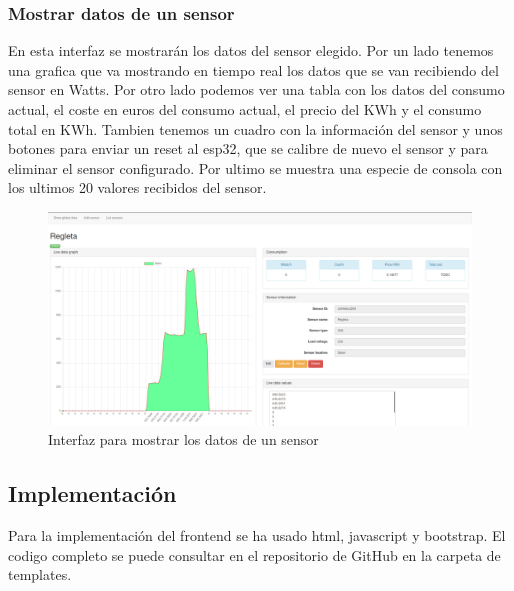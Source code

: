 \begin{titlepage}
\subsubsection{Mostrar datos de un sensor}
En esta interfaz se mostrarán los datos del sensor elegido. Por un lado tenemos una grafica que va mostrando en tiempo real los datos que se van recibiendo del sensor en Watts. Por otro lado podemos ver una tabla con los datos del consumo actual, el coste en euros del consumo actual, el precio del KWh y el consumo total en KWh. Tambien tenemos un cuadro con la información del sensor y unos botones para enviar un reset al esp32, que se calibre de nuevo el sensor y para eliminar el sensor configurado. Por ultimo se muestra una especie de consola con los ultimos 20 valores recibidos del sensor. 
\begin{figure}[h!]
	\centering
	\includegraphics[width=1\textwidth]{imagenes/web_datos.png}
	\caption{Interfaz para mostrar los datos de un sensor}
\end{figure}
\subsection{Implementación}
Para la implementación del frontend se ha usado html, javascript y bootstrap. El codigo completo se puede consultar en el repositorio de GitHub\cite{ref25} en la carpeta de templates.


\end{titlepage}
